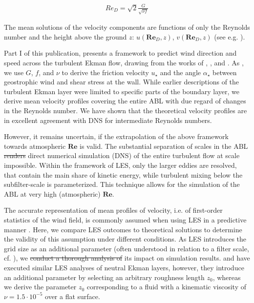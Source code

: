 \documentclass[smallcondensed,draft]{svjour3} %
\newcommand{\RE}{\mathbf{Re}}
\providecommand{\DIFadd}[1]{{\protect\color{blue}\uwave{#1}}} %
\providecommand{\DIFdel}[1]{{\protect\color{red}\sout{#1}}}                      %
\providecommand{\DIFaddbegin}{} %
\providecommand{\DIFaddend}{} %
\providecommand{\DIFdelbegin}{} %
\providecommand{\DIFdelend}{} %
\newcommand{\DIFscaledelfig}{0.5}
\newlength{\DIFdelgraphicswidth} %
\newlength{\DIFdelgraphicsheight} %
\newcommand{\DIFaddincludegraphics}[2][]{{\color{blue}\fbox{\DIFOincludegraphics[#1]{#2}}}} %
\newcommand{\DIFdelincludegraphics}[2][]{%
\sbox{\DIFdelgraphicsbox}{\DIFOincludegraphics[#1]{#2}}%
\settoboxwidth{\DIFdelgraphicswidth}{\DIFdelgraphicsbox} %
\settoboxtotalheight{\DIFdelgraphicsheight}{\DIFdelgraphicsbox} %
\scalebox{\DIFscaledelfig}{%
\parbox[b]{\DIFdelgraphicswidth}{\usebox{\DIFdelgraphicsbox}\\[-\baselineskip] \rule{\DIFdelgraphicswidth}{0em}}\llap{\resizebox{\DIFdelgraphicswidth}{\DIFdelgraphicsheight}{%
\setlength{\unitlength}{\DIFdelgraphicswidth}%
\begin{picture}(1,1)%
\thicklines\linethickness{2pt} %
{\color[rgb]{1,0,0}\put(0,0){\framebox(1,1){}}}%
{\color[rgb]{1,0,0}\put(0,0){\line( 1,1){1}}}%
{\color[rgb]{1,0,0}\put(0,1){\line(1,-1){1}}}%
\end{picture}%
}\hspace*{3pt}}} %
} %
\DeclareRobustCommand{\DIFaddbegin}{\DIFOaddbegin \let\includegraphics\DIFaddincludegraphics} %
\DeclareRobustCommand{\DIFaddend}{\DIFOaddend \let\includegraphics\DIFOincludegraphics} %
\DeclareRobustCommand{\DIFdelbegin}{\DIFOdelbegin \let\includegraphics\DIFdelincludegraphics} %
\DeclareRobustCommand{\DIFdelend}{\DIFOaddend \let\includegraphics\DIFOincludegraphics} %
\begin{document}
\DIFdelend \DIFaddbegin \DIFadd{, we write
}\DIFaddend \begin{align}\label{red}
 Re_D = \sqrt{2}\frac{G}{\sqrt{\nu f}}
\end{align}
\DIFdelbegin %

\DIFdelend %
The mean solutions of the velocity components are functions of only the Reynolds number and the height above the ground $z$: $u(\RE_D,z)$, $v(\RE_D,z)$ (see e.g. \cite{csanady1967resistance}).

Part I of this publication, presents a framework to predict wind direction and speed across the turbulent Ekman flow, drawing from the works of \cite{csanady1967resistance}, \cite{tennekes1973logarithmic}, and \cite{spalart1989theoretical}. As \cite{spalart1989theoretical}, we use $G$, $f$, and $\nu$ to derive the friction velocity $u_\star$ and the angle $\alpha_\star$ between geostrophic wind and shear stress at the wall. While earlier descriptions of the turbulent Ekman layer were limited to specific parts of the boundary layer, we derive mean velocity profiles covering the entire ABL with due regard of changes in the Reynolds number. We have shown that the theoretical velocity profiles are in excellent agreement with DNS for intermediate Reynolds numbers. 

However, it remains uncertain, if the extrapolation of the above framework towards atmospheric $\RE$ is valid. The substantial separation of scales in the ABL \DIFdelbegin \DIFdel{renders }\DIFdelend \DIFaddbegin \DIFadd{makes }\DIFaddend direct numerical simulation (DNS) of the entire turbulent flow at \DIFaddbegin \DIFadd{geophysical }\DIFaddend scale impossible. Within the framework of LES, only the larger eddies are resolved, that contain the main share of kinetic energy, while turbulent mixing below the subfilter-scale is parameterized. This technique allows for the simulation of the ABL at very high (atmospheric) $\RE$. 

The accurate representation of mean profiles of velocity, i.e. of first-order statistics of the wind field, is commonly assumed when using LES in a predictive manner  \citep{fedorovich2004convective}. Here, we compare LES outcomes to theoretical solutions to determine the validity of this assumption under different conditions. As LES introduces the grid size as an additional parameter (often understood in relation to a filter scale, cf. \cite{pope2004ten}), we \DIFdelbegin \DIFdel{conduct a thorough analysis of }\DIFdelend \DIFaddbegin \DIFadd{analyse }\DIFaddend its impact on simulation results. \cite{esau2004simulation} and \cite{jiang2018large} have executed similar LES analyses of neutral Ekman layers, however, they introduce an additional parameter by selecting an arbitrary roughness length $z_0$, whereas we derive the parameter $z_0$ corresponding to a fluid with a kinematic viscosity of $\nu = 1.5\cdot10^{-5}$ over a flat surface.
\end{document}
